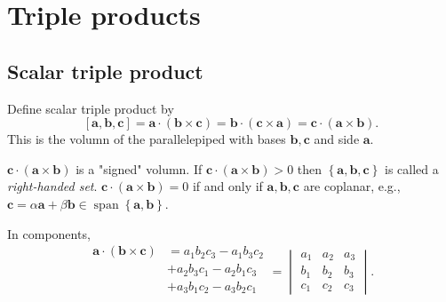 \documentclass[10pt]{article}
\DeclareMathOperator{\spn}{span}
\begin{document}
    \section{Triple products}
    \subsection{Scalar triple product}
    \begin{definition}
        Define scalar triple product by
        \[
            [\mathbf{a},\mathbf{b},\mathbf{c}]=\mathbf{a}\cdot (\mathbf{b} \times \mathbf{c})=\mathbf{b}\cdot (\mathbf{c} \times \mathbf{a})=\mathbf{c}\cdot (\mathbf{a}\times \mathbf{b})
        .\]
        This is the volumn of the parallelepiped with bases $ \mathbf{b}, \mathbf{c} $ and side $ \mathbf{a} .$
    \end{definition}
    \begin{remark}
        $ \mathbf{c}\cdot (\mathbf{a}\times \mathbf{b}) $ is a "signed" volumn. If $ \mathbf{c}\cdot (\mathbf{a}\times \mathbf{b})>0 $ then $ \left\{ \mathbf{a},\mathbf{b},\mathbf{c}\right\} $ is called a \textit{right-handed set}. $ \mathbf{c}\cdot (\mathbf{a}\times \mathbf{b})=0 $ if and only if $ \mathbf{a},\mathbf{b},\mathbf{c} $ are coplanar, e.g., $ \mathbf{c}=\alpha \mathbf{a}+\beta \mathbf{b} \in \spn\left\{ \mathbf{a},\mathbf{b}\right\}$.
    \end{remark}
    In components, 
    \[
        \begin{aligned}
            \mathbf{a}\cdot (\mathbf{b}\times \mathbf{c})&=a_1b_2c_3-a_1b_3c_2 \\
            &+a_2b_3c_1-a_2b_1c_3\\
            &+a_3b_1c_2-a_3b_2c_1\\
        \end{aligned} =\begin{vmatrix}
            a_{1} & a_{2} & a_{3} \\
            b_{1} & b_{2} & b_{3} \\
            c_{1} & c_{2} & c_{3}
        \end{vmatrix}.
    \]
\end{document}
